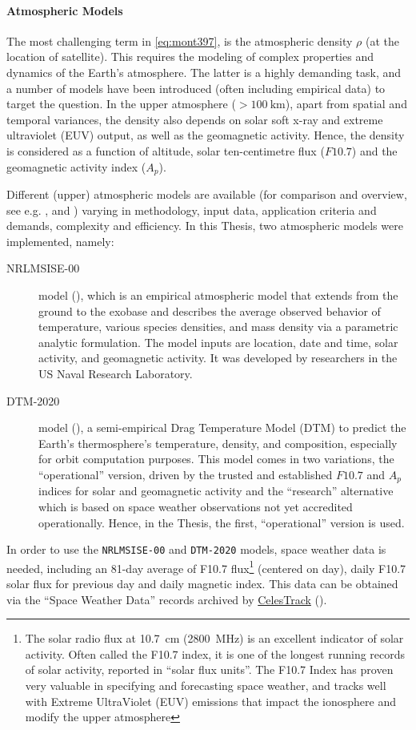 \paragraph{Atmospheric Models}\label{par:atmospheric-models}
The most challenging term in \autoref{eq:mont397}, is the atmospheric density $\rho$ 
(at the location of satellite). This requires the modeling of complex properties 
and dynamics of the Earth's atmosphere. The latter is a highly demanding task, and 
a number of models have been introduced (often including empirical data) to 
target the question. In the upper atmosphere ($>\SI{100}{\km}$), apart from spatial 
and temporal variances, the density also depends on solar soft x-ray and extreme 
ultraviolet (EUV) output, as well as the geomagnetic activity. Hence, the density is 
considered as a function of altitude, solar ten-centimetre flux ($F10.7$) and the 
geomagnetic activity index ($A_p$). 

Different (upper) atmospheric models are available (for comparison and overview, 
see e.g. \cite{Doornbos2009}, \cite{Yang2022} and \cite{Vallado2014}) varying in 
methodology, input data, application criteria and demands, complexity and efficiency. 
In this Thesis, two atmospheric models were implemented, namely:
\begin{description}
  \item[NRLMSISE-00] model (\cite{nrlmsise00}), which is an empirical atmospheric model that 
extends from the ground to the exobase and describes the average observed behavior 
of temperature, various species densities, and mass density via a parametric 
analytic formulation. The model inputs are location, date and time, solar activity, 
and geomagnetic activity. It was developed by researchers in the US Naval Research 
Laboratory.
  \item[DTM-2020] model (\cite{Bruinsma2021}), a semi-empirical Drag Temperature Model (DTM) 
  to predict the Earth's thermosphere's temperature, density, and composition, 
  especially for orbit computation purposes. This model comes in two variations, 
  the ``operational'' version, driven by the trusted and established $F10.7$ and $A_p$ 
  indices for solar and geomagnetic activity and the ``research'' alternative which 
  is based on space weather observations not yet accredited operationally. Hence, 
  in the Thesis, the first, ``operational'' version is used.
\end{description}

In order to use the \texttt{NRLMSISE-00} and \texttt{DTM-2020} models, space weather data is needed, including 
an 81-day average of F10.7 flux\footnote{The solar radio flux at \SI{10.7}{\cm} (\SI{2800}{\MHz}) 
is an excellent indicator of solar activity. Often called the F10.7 index, it is 
one of the longest running records of solar activity, reported in ``solar flux units''. 
The F10.7 Index has proven very valuable in specifying and forecasting space weather, 
and tracks well with Extreme UltraViolet (EUV) emissions that impact the ionosphere 
and modify the upper atmosphere} (centered on day), daily F10.7 solar flux for previous 
day and daily magnetic index. This data can be obtained via the ``Space Weather Data'' 
records archived by \href{https://celestrak.org/}{CelesTrack} (\cite{Vallado2013}).

